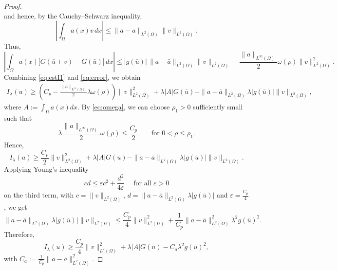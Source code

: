 \documentclass[11pt,reqno]{amsart}
\theoremstyle{plain}
\theoremstyle{definition}
\numberwithin{equation}{section}
\begin{document}
\begin{proof}
$$    $$
    and hence, by the Cauchy--Schwarz inequality,
    $$
        \left|\int_\Omega a(x)v\,dx\right|
        \leq
        \|a-\bar a\|_{L^2(\Omega)}
        \|v\|_{L^2(\Omega)}.
    $$
    Thus, 
    \begin{equation}\label{eq:error}
        \left|
        \int_\Omega
        a(x)\big[G(\bar u+v)-G(\bar u)\big]\,dx
        \right|
        \leq |g(\bar u)|\,
        \|a-\bar a\|_{L^2 (\Omega)} \|v\|_{L^2(\Omega)}
        +
        \frac{\|a\|_{L^\infty (\Omega) }}{2}\omega(\rho)\|v\|_{L^2(\Omega)}^2.
    \end{equation}
    Combining \eqref{eq:estI1} and \eqref{eq:error}, we obtain
    \begin{equation}\label{eq:Ilambda-est}
    \begin{aligned}
        I_\lambda(u)
        \geq{}
        \left(C_p-\frac{\|a\|_{L^\infty (\Omega) }}{2}\lambda\omega(\rho)\right)
        \|v\|_{L^2(\Omega)}^2
        +\lambda |A|G(\bar u)
        -\|a-\bar a \|_{L^2 (\Omega)}\lambda |g(\bar u)|
        \|v\|_{L^2(\Omega)},
    \end{aligned}
    \end{equation}
    where $A := \int_\Omega a(x) dx$. By \eqref{eq:omega}, we can choose $\rho_1>0$ sufficiently small
    such that
    $$
        \lambda\frac{\|a\|_{L^\infty (\Omega) }}{2}\omega(\rho)\leq\frac{C_p}{2}
        \qquad\text{for }0<\rho\leq\rho_1.
    $$
    Hence,
    \begin{equation}\label{eq:Ilambda-est2}
    I_\lambda(u)
    \geq
    \frac {C_p} 2\|v\|_{L^2(\Omega)}^2
    +\lambda |A|G(\bar u)
    -\|a-\bar a \|_{L^2(\Omega)}\lambda |g(\bar u)|
    \|v\|_{L^2(\Omega)}.
    \end{equation}
    Applying Young's inequality
    $$cd \leq \varepsilon c^2 + \frac{d^2}{4\varepsilon} \quad \text{ for all } \varepsilon>0$$
    on the third term, with $c = \|v\|_{L^2(\Omega)}$, $d = \|a-\bar a \|_{L^2(\Omega)}\lambda |g(\bar u)|$ and $\varepsilon = \frac{C_p}{4}$, we get
    $$
        \|a-\bar a\|_{L^2(\Omega) }\lambda |g(\bar u)|
        \|v\|_{L^2(\Omega)}
        \leq
        \frac{C_p} 4\|v\|_{L^2(\Omega)}^2
        + \frac{1}{C_p} \|a-\bar a\|^2_{L^2(\Omega) }\lambda^2 g(\bar u)^2.
    $$
 Therefore,
    \begin{equation}\label{eq:Ilambda-est3}
        I_\lambda(u)
        \geq
        \frac {C_p}4\|v\|_{L^2(\Omega)}^2
        +\lambda |A|G(\bar u)
        -C_a\lambda^2g(\bar u)^2,
    \end{equation}
    with $C_a := \frac{1}{C_p} \|a-\bar a\|^2_{L^2(\Omega) }.$

\end{proof}
\end{document}
